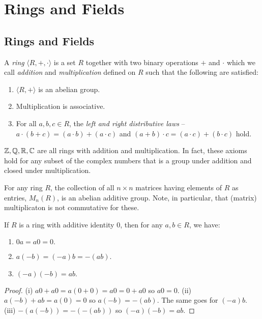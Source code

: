 \chapter{Rings and Fields}

\section{Rings and Fields}

\begin{definition}[Ring]
    A \emph{ring} $\langle R, +, \cdot\rangle$ is a set $R$ together with two binary operations $+$ and $\cdot$ which we call \emph{addition} and \emph{multiplication} defined on $R$ such that the following are satisfied: \begin{enumerate}[label = ($\mathscr{R}_{\arabic*}$)]
        \item $\langle R, +\rangle$ is an abelian group.
        \item Multiplication is associative.
        \item For all $a, b, c \in R$, the \emph{left and right distributive laws} – $a\cdot(b+c)=(a\cdot b)+(a\cdot c)$ and $(a+b)\cdot c = (a\cdot c)+(b\cdot c)$ hold.
    \end{enumerate}
\end{definition}
\begin{example}
    $\mathbb{Z}, \mathbb{Q}, \mathbb{R}, \mathbb{C}$ are all rings with addition and multiplication. In fact, these axioms hold for any subset of the complex numbers that is a group under addition and closed under multiplication.
\end{example}
\begin{example}
    For any ring $R$, the collection of all $n\times n $ matrices having elements of $R$ as entries, $M_n(R)$, is an abelian additive group. Note, in particular, that (matrix) multiplicaton is not commutative for these.
\end{example}
\begin{theorem}
    If $R$ is a ring with additive identity 0, then for any $a,b \in R$, we have: \begin{enumerate}
        \item $0a = a0 =0.$
        \item $a(-b) = (-a)b = -(ab)$.
        \item $(-a)(-b)=ab.$
    \end{enumerate}
\end{theorem}
\begin{proof}
    (i) $a0+a0 = a(0+0) = a0 = 0+a0$ so $a0 = 0.$ (ii) $a(-b) + ab = a(0) = 0$ so $a(-b) = -(ab)$. The same goes for $(-a)b$. (iii) $-(a(-b))=-(-(ab))$ so $(-a)(-b)=ab.$
\end{proof}
